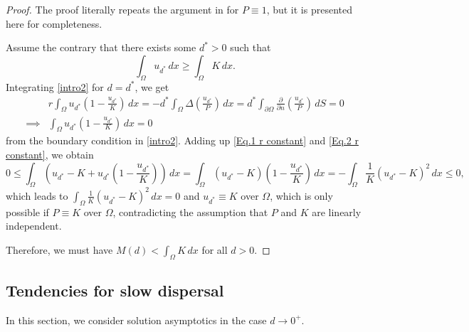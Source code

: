 \documentclass[11pt]{article}
\newcommand{\parentheses}[1]{\left(#1\right)}
\theoremstyle{definition}
\theoremstyle{remark}
\begin{document}
\begin{proof}
The proof literally repeats the argument in  \cite{Guo_2020} for $P \equiv 1$, but it is presented here for completeness.

    Assume the contrary that there exists some $d^*>0$ such that
    \begin{equation}\label{Eq.1 r constant}
        \int_\Omega u_{d^*}\,dx\geq\int_\Omega K\,dx.
    \end{equation}
    Integrating \eqref{intro2} for $d=d^*$, we get
    \begin{align}
        \nonumber&r\int_\Omega u_{d^*}\parentheses{1-\frac{u_{d^*}}{K}}\,dx=-d^*\int_\Omega\Delta\parentheses{\frac{u_{d^*}}{P}}\,dx=d^*\int_{\partial\Omega}\frac{\partial}{\partial n}\parentheses{\frac{u_{d^*}}{P}}\,dS=0\\
        \label{Eq.2 r constant}\implies&\int_\Omega u_{d^*}\parentheses{1-\frac{u_{d^*}}{K}}\,dx=0
    \end{align}
    from the boundary condition in \eqref{intro2}. Adding up \eqref{Eq.1 r constant} and \eqref{Eq.2 r constant}, we obtain
    \begin{equation*}
        0\leq\int_\Omega \parentheses{u_{d^*}- K+u_{d^*}\parentheses{1-\frac{u_{d^*}}{K}}}\,dx=\int_\Omega\parentheses{u_{d^*}-K}\parentheses{1-\frac{u_{d^*}}{K}}\,dx=-\int_\Omega\frac{1}{K}\parentheses{u_{d^*}-K}^2\,dx\leq0,
    \end{equation*}
    which leads to $\int_\Omega\frac{1}{K}\parentheses{u_{d^*}-K}^2\,dx=0$ and $u_{d^*}\equiv K$ over $\Omega$, which is only possible if $P\equiv K$ over $\Omega$, contradicting the assumption that $P$ and $K$ are linearly independent.

    Therefore, we must have $M(d)<\int_\Omega K\,dx$ for all $d>0$.
        
\end{proof}




\subsection{Tendencies for slow dispersal}

In this section, we consider solution asymptotics in the case $d \to 0^+$.
\end{document}
